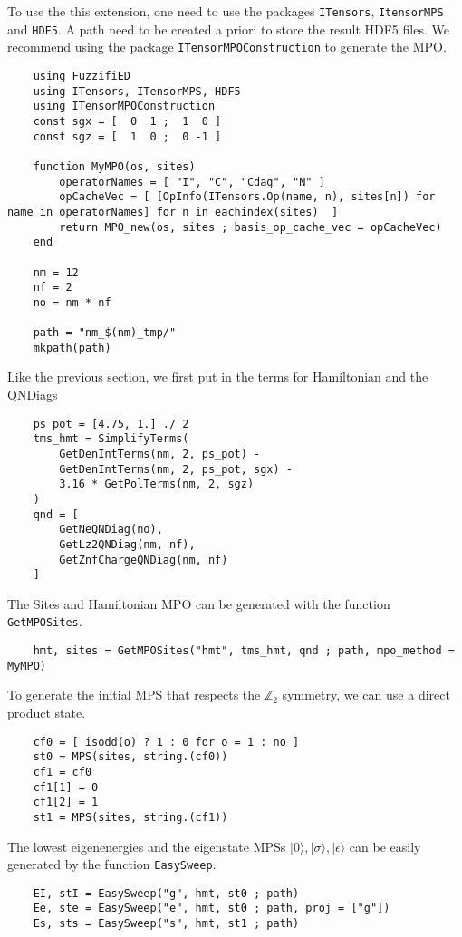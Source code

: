 \documentclass{timesjhep}
\begin{document}
To use the this extension, one need to use the packages \lstinline|ITensors|, \lstinline|ItensorMPS| and \lstinline|HDF5|. A path need to be created a priori to store the result HDF5 files. We recommend using the package \lstinline|ITensorMPOConstruction| to generate the MPO. 
\begin{lstlisting}
    using FuzzifiED
    using ITensors, ITensorMPS, HDF5
    using ITensorMPOConstruction
    const sgx = [  0  1 ;  1  0 ]
    const sgz = [  1  0 ;  0 -1 ]

    function MyMPO(os, sites)
        operatorNames = [ "I", "C", "Cdag", "N" ]
        opCacheVec = [ [OpInfo(ITensors.Op(name, n), sites[n]) for name in operatorNames] for n in eachindex(sites)  ]
        return MPO_new(os, sites ; basis_op_cache_vec = opCacheVec)
    end

    nm = 12
    nf = 2
    no = nm * nf

    path = "nm_$(nm)_tmp/"
    mkpath(path)
\end{lstlisting}
Like the previous section, we first put in the terms for Hamiltonian and the QNDiags 
\begin{lstlisting}
    ps_pot = [4.75, 1.] ./ 2
    tms_hmt = SimplifyTerms(
        GetDenIntTerms(nm, 2, ps_pot) - 
        GetDenIntTerms(nm, 2, ps_pot, sgx) - 
        3.16 * GetPolTerms(nm, 2, sgz)
    )
    qnd = [ 
        GetNeQNDiag(no), 
        GetLz2QNDiag(nm, nf), 
        GetZnfChargeQNDiag(nm, nf) 
    ]
\end{lstlisting}
The Sites and Hamiltonian MPO can be generated with the function \lstinline|GetMPOSites|. 
\begin{lstlisting}
    hmt, sites = GetMPOSites("hmt", tms_hmt, qnd ; path, mpo_method = MyMPO)
\end{lstlisting}
To generate the initial MPS that respects the $\mathbb{Z}_2$ symmetry, we can use a direct product state. 
\begin{lstlisting}
    cf0 = [ isodd(o) ? 1 : 0 for o = 1 : no ]
    st0 = MPS(sites, string.(cf0))
    cf1 = cf0
    cf1[1] = 0
    cf1[2] = 1
    st1 = MPS(sites, string.(cf1))
\end{lstlisting}
The lowest eigenenergies and the eigenstate MPSs $|0\rangle,|\sigma\rangle,|\epsilon\rangle$ can be easily generated by the function \lstinline|EasySweep|.
\begin{lstlisting}
    EI, stI = EasySweep("g", hmt, st0 ; path)
    Ee, ste = EasySweep("e", hmt, st0 ; path, proj = ["g"])
    Es, sts = EasySweep("s", hmt, st1 ; path)
\end{lstlisting}
\end{document}
